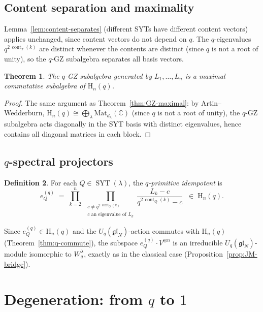 \documentclass[12pt,a4paper]{article}
\newtheorem{theorem}{Theorem}[section]
\theoremstyle{definition}
\newtheorem{definition}[theorem]{Definition}
\theoremstyle{remark}
\newcommand{\C}{\mathbb{C}}
\newcommand{\gl}{\mathfrak{gl}}
\newcommand{\SYT}{\operatorname{SYT}}
\newcommand{\cont}{\operatorname{cont}}
\begin{document}
\subsection{Content separation and maximality}

Lemma~\ref{lem:content-separates} (different SYTs have different
content vectors) applies unchanged, since content vectors do not
depend on $q$. The $q$-eigenvalues $q^{2\,\cont_T(k)}$ are distinct
whenever the contents are distinct (since $q$ is not a root of unity),
so the $q$-GZ subalgebra separates all basis vectors.

\begin{theorem}\label{thm:q-GZ-maximal}
The $q$-GZ subalgebra generated by $L_1, \ldots, L_n$ is a maximal
commutative subalgebra of $\mathrm{H}_n(q)$.
\end{theorem}

\begin{proof}
The same argument as Theorem~\ref{thm:GZ-maximal}: by
Artin--Wedderburn, $\mathrm{H}_n(q) \cong
\bigoplus_\lambda \mathrm{Mat}_{d_\lambda}(\C)$ (since $q$ is not a
root of unity), the $q$-GZ subalgebra acts diagonally in the SYT
basis with distinct eigenvalues, hence contains all diagonal matrices
in each block.
\end{proof}

\subsection{$q$-spectral projectors}

\begin{definition}\label{def:q-primitive-idempotent}
For each $Q \in \SYT(\lambda)$, the \emph{$q$-primitive idempotent} is
\[
  e_Q^{(q)} \;=\; \prod_{k=2}^{n}\;\prod_{\substack{c \neq
    q^{2\,\cont_Q(k)} \\
    c \text{ an eigenvalue of } L_k}}
    \frac{L_k - c}{q^{2\,\cont_Q(k)} - c}
  \;\;\in\; \mathrm{H}_n(q).
\]
\end{definition}

Since $e_Q^{(q)} \in \mathrm{H}_n(q)$ and the $U_q(\gl_N)$-action
commutes with $\mathrm{H}_n(q)$
(Theorem~\ref{thm:q-commute}), the subspace
$e_Q^{(q)} \cdot V^{\otimes n}$ is an irreducible
$U_q(\gl_N)$-module isomorphic to $W_q^\lambda$, exactly as in
the classical case (Proposition~\ref{prop:JM-bridge}).

\section{Degeneration: from $q$ to $1$}
\label{sec:degeneration}
\end{document}
